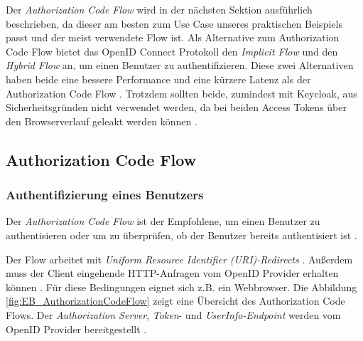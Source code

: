 
Der \textit{Authorization Code Flow} wird in der nächsten Sektion ausführlich beschrieben, da dieser am besten zum Use Case unseres praktischen Beispiels passt und der meist verwendete Flow ist. Als Alternative zum Authorization Code Flow bietet das OpenID Connect Protokoll den \textit{Implicit Flow} und den \textit{Hybrid Flow} an, um einen Benutzer zu authentifizieren. Diese zwei Alternativen haben beide eine bessere Performance \cite[Implicit and Hybrid Flow]{EB26} und eine kürzere Latenz als der Authorization Code Flow \cite[Code Flow]{EB20}. Trotzdem sollten beide, zumindest mit Keycloak, aus Sicherheitsgründen nicht verwendet werden, da bei beiden Access Tokens über den Browserverlauf geleakt werden können \cite{EB26} \cite[Implicit Flow]{SSEB_keycloakDocs}.

\subsection{Authorization Code Flow}

\subsubsection{Authentifizierung eines Benutzers} \label{EB_Authentifizierung_eines_Benutzers}

Der \textit{Authorization Code Flow} ist der Empfohlene, um einen Benutzer zu authentisieren oder um zu überprüfen, ob der Benutzer bereits authentisiert ist \cite[Authorization Code Flow]{SSEB_keycloakDocs}. 

Der Flow arbeitet mit \textit{Uniform Resource Identifier (URI)-Redirects} \cite{EB12}. Außerdem muss der Client eingehende HTTP-Anfragen vom OpenID Provider erhalten können \cite{EB12}. Für diese Bedingungen eignet sich z.B. ein Webbrowser. Die Abbildung \ref{fig:EB_AuthorizationCodeFlow} zeigt eine Übersicht des Authorization Code Flows. Der \textit{Authorization Server}, \textit{Token}- und \textit{UserInfo-Endpoint} werden vom OpenID Provider bereitgestellt \cite{EB12} \cite[Keycloak URI Endpoints]{SSEB_keycloakDocs}.

